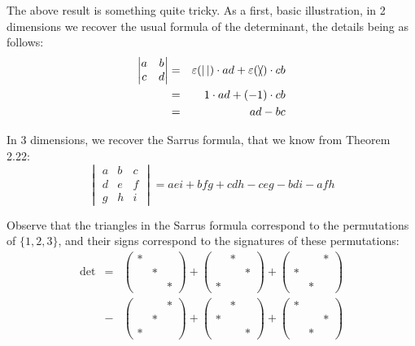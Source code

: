 \documentclass[12pt]{amsbook}
\begin{document}
The above result is something quite tricky. As a first, basic illustration, in 2 dimensions we recover the usual formula of the determinant, the details being as follows:
\begin{eqnarray*}
\begin{vmatrix}a&b\\ c&d\end{vmatrix}
&=&\varepsilon(|\,|)\cdot ad+\varepsilon(\slash\hskip-2mm\backslash)\cdot cb\\
&=&1\cdot ad+(-1)\cdot cb\\
&=&ad-bc
\end{eqnarray*}

In 3 dimensions, we recover the Sarrus formula, that we know from Theorem 2.22:
$$\begin{vmatrix}a&b&c\\ d&e&f\\ g&h&i\end{vmatrix}=aei+bfg+cdh-ceg-bdi-afh$$

Observe that the triangles in the Sarrus formula correspond to the permutations of $\{1,2,3\}$, and their signs correspond to the signatures of these permutations:
\begin{eqnarray*}
\det
&=&\begin{pmatrix}*&&\\ &*&\\ &&*\end{pmatrix}
+\begin{pmatrix}&*&\\ &&*\\ *&&\end{pmatrix}
+\begin{pmatrix}&&*\\ *&&\\ &*&\end{pmatrix}\\
&-&\begin{pmatrix}&&*\\ &*&\\ *&&\end{pmatrix}
+\begin{pmatrix}&*&\\ *&&\\ &&*\end{pmatrix}
+\begin{pmatrix}*&&\\ &&*\\ &*&\end{pmatrix}
\end{eqnarray*}
\end{document}

